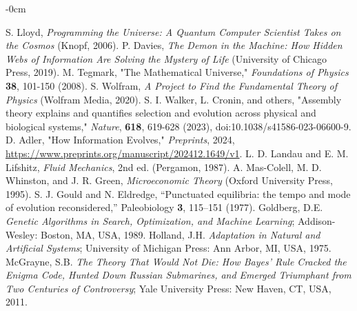 \documentclass[entropy,article,submit,pdftex,oneauthor]{Definitions/mdpi}
\begin{document}
\begin{adjustwidth}{-\extralength}{0cm}


\begin{thebibliography}{999}
     S. Lloyd, \textit{Programming the Universe: A Quantum Computer Scientist Takes on the Cosmos} (Knopf, 2006).
     P. Davies, \textit{The Demon in the Machine: How Hidden Webs of Information Are Solving the Mystery of Life} (University of Chicago Press, 2019).
     M. Tegmark, "The Mathematical Universe," \textit{Foundations of Physics} \textbf{38}, 101-150 (2008).
     S. Wolfram, \textit{A Project to Find the Fundamental Theory of Physics} (Wolfram Media, 2020).
    S. I. Walker, L. Cronin, and others,
    "Assembly theory explains and quantifies selection and evolution across physical and biological systems,"
    \textit{Nature}, \textbf{618}, 619-628 (2023),
    doi:10.1038/s41586-023-06600-9.
     D. Adler, "How Information Evolves," \textit{Preprints}, 2024, \url{https://www.preprints.org/manuscript/202412.1649/v1}.
     L. D. Landau and E. M. Lifshitz, \textit{Fluid Mechanics}, 2nd ed. (Pergamon, 1987).
     A. Mas-Colell, M. D. Whinston, and J. R. Green, \textit{Microeconomic Theory} (Oxford University Press, 1995).
    S. J. Gould and N. Eldredge, ``Punctuated equilibria: the tempo and mode of evolution reconsidered,'' Paleobiology \textbf{3}, 115–151 (1977).
    Goldberg, D.E. \textit{Genetic Algorithms in Search, Optimization, and Machine Learning}; Addison-Wesley: Boston, MA, USA, 1989.
    Holland, J.H. \textit{Adaptation in Natural and Artificial Systems}; University of Michigan Press: Ann Arbor, MI, USA, 1975.
    McGrayne, S.B. \textit{The Theory That Would Not Die: How Bayes' Rule Cracked the Enigma Code, Hunted Down Russian Submarines, and Emerged Triumphant from Two Centuries of Controversy}; Yale University Press: New Haven, CT, USA, 2011.

\end{thebibliography}
\end{adjustwidth}
\end{document}
